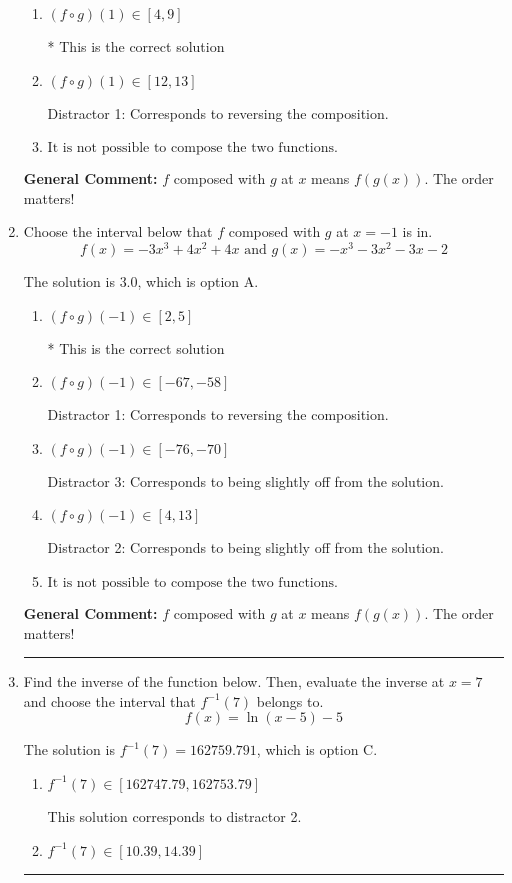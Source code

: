\documentclass{extbook}[14pt]
\newcommand{\litem}[1]{\item #1

\rule{\textwidth}{0.4pt}}
\begin{document}
\begin{enumerate}
{\begin{enumerate}[label=\Alph*.]
 Distractor 2: Corresponds to being slightly off from the solution.
\item \( (f \circ g)(1) \in [4, 9] \)

* This is the correct solution
\item \( (f \circ g)(1) \in [12, 13] \)

 Distractor 1: Corresponds to reversing the composition.
\item \( \text{It is not possible to compose the two functions.} \)


\end{enumerate}

\textbf{General Comment:} $f$ composed with $g$ at $x$ means $f(g(x))$. The order matters!
}
\litem{
Choose the interval below that $f$ composed with $g$ at $x=-1$ is in.
\[ f(x) = -3x^{3} +4 x^{2} +4 x \text{ and } g(x) = -x^{3} -3 x^{2} -3 x -2 \]

The solution is \( 3.0 \), which is option A.\begin{enumerate}[label=\Alph*.]
\item \( (f \circ g)(-1) \in [2, 5] \)

* This is the correct solution
\item \( (f \circ g)(-1) \in [-67, -58] \)

 Distractor 1: Corresponds to reversing the composition.
\item \( (f \circ g)(-1) \in [-76, -70] \)

 Distractor 3: Corresponds to being slightly off from the solution.
\item \( (f \circ g)(-1) \in [4, 13] \)

 Distractor 2: Corresponds to being slightly off from the solution.
\item \( \text{It is not possible to compose the two functions.} \)


\end{enumerate}

\textbf{General Comment:} $f$ composed with $g$ at $x$ means $f(g(x))$. The order matters!
}
\litem{
Find the inverse of the function below. Then, evaluate the inverse at $x = 7$ and choose the interval that $f^{-1}(7)$ belongs to.
\[ f(x) = \ln{(x-5)}-5 \]

The solution is \( f^{-1}(7) = 162759.791 \), which is option C.\begin{enumerate}[label=\Alph*.]
\item \( f^{-1}(7) \in [162747.79, 162753.79] \)

 This solution corresponds to distractor 2.
\item \( f^{-1}(7) \in [10.39, 14.39] \)


\end{enumerate}}
\end{enumerate}
\end{document}
